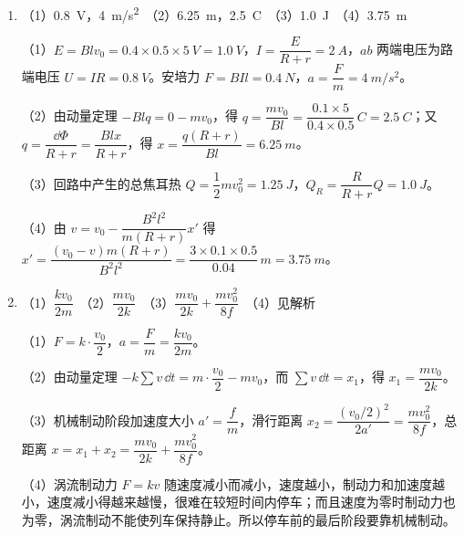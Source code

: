 \begin{enumerate}[label=\arabic*．,leftmargin=1.8em,itemsep=4pt,start=10]



\item {}（1）\qty{0.8}{V}，\qty{4}{m/s^2}　（2）\qty{6.25}{m}，\qty{2.5}{C}　（3）\qty{1.0}{J}　（4）\qty{3.75}{m}

（1）$E=Blv_0=0.4\times0.5\times\qty{5}{V}=\qty{1.0}{V}$，$I=\dfrac{E}{R+r}=\qty{2}{A}$，$ab$ 两端电压为路端电压 $U=IR=\qty{0.8}{V}$。安培力 $F=BIl=\qty{0.4}{N}$，$a=\dfrac Fm=\qty{4}{m/s^2}$。

（2）由动量定理 $-Blq=0-mv_0$，得 $q=\dfrac{mv_0}{Bl}=\dfrac{0.1\times5}{0.4\times0.5}\,\unit{C}=\qty{2.5}{C}$；又 $q=\dfrac{\dd\Phi}{R+r}=\dfrac{Blx}{R+r}$，得 $x=\dfrac{q(R+r)}{Bl}=\qty{6.25}{m}$。

（3）回路中产生的总焦耳热 $Q=\dfrac12mv_0^2=\qty{1.25}{J}$，$Q_R=\dfrac{R}{R+r}Q=\qty{1.0}{J}$。

（4）由 $v=v_0-\dfrac{B^2l^2}{m(R+r)}x'$ 得 $x'=\dfrac{(v_0-v)m(R+r)}{B^2l^2}=\dfrac{3\times0.1\times0.5}{0.04}\,\unit{m}=\qty{3.75}{m}$。

\item {}（1）$\dfrac{kv_0}{2m}$　（2）$\dfrac{mv_0}{2k}$　（3）$\dfrac{mv_0}{2k}+\dfrac{mv_0^2}{8f}$　（4）见解析

（1）$F=k\cdot\dfrac{v_0}{2}$，$a=\dfrac Fm=\dfrac{kv_0}{2m}$。

（2）由动量定理 $-k\sum v\,\dd t=m\cdot\dfrac{v_0}{2}-mv_0$，而 $\sum v\,\dd t=x_1$，得 $x_1=\dfrac{mv_0}{2k}$。

（3）机械制动阶段加速度大小 $a'=\dfrac fm$，滑行距离 $x_2=\dfrac{(v_0/2)^2}{2a'}=\dfrac{mv_0^2}{8f}$，总距离 $x=x_1+x_2=\dfrac{mv_0}{2k}+\dfrac{mv_0^2}{8f}$。

（4）涡流制动力 $F=kv$ 随速度减小而减小，速度越小，制动力和加速度越小，速度减小得越来越慢，很难在较短时间内停车；而且速度为零时制动力也为零，涡流制动不能使列车保持静止。所以停车前的最后阶段要靠机械制动。
\end{enumerate}

